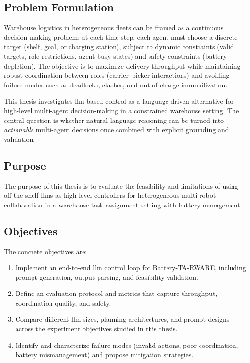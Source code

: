 \subsection{Problem Formulation}
Warehouse logistics in heterogeneous fleets can be framed as a continuous decision-making problem: at each time step, each agent must choose a discrete target (shelf, goal, or charging station), subject to dynamic constraints (valid targets, role restrictions, agent busy states) and safety constraints (battery depletion).
The objective is to maximize delivery throughput while maintaining robust coordination between roles (carrier--picker interactions) and avoiding failure modes such as deadlocks, clashes, and out-of-charge immobilization.

This thesis investigates \gls{llm}-based control as a language-driven alternative for high-level multi-agent decision-making in a constrained warehouse setting.
The central question is whether natural-language reasoning can be turned into \emph{actionable} multi-agent decisions once combined with explicit grounding and validation.

\subsection{Purpose}
The purpose of this thesis is to evaluate the feasibility and limitations of using off-the-shelf \glspl{llm} as high-level controllers for heterogeneous multi-robot collaboration in a warehouse task-assignment setting with battery management.

\subsection{Objectives}
The concrete objectives are:
\begin{enumerate}
    \item Implement an end-to-end \gls{llm} control loop for Battery-TA-RWARE, including prompt generation, output parsing, and feasibility validation.
    \item Define an evaluation protocol and metrics that capture throughput, coordination quality, and safety.
    \item Compare different \gls{llm} sizes, planning architectures, and prompt designs across the experiment objectives studied in this thesis.
    \item Identify and characterize failure modes (invalid actions, poor coordination, battery mismanagement) and propose mitigation strategies.
\end{enumerate}

